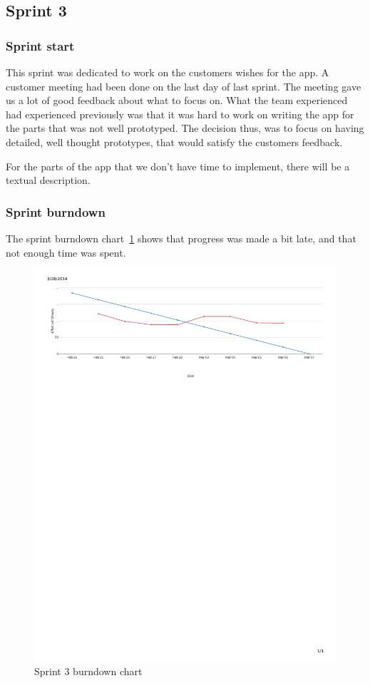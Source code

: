 \subsection{Sprint 3}
\subsubsection{Sprint start}
This sprint was dedicated to work on the customers wishes for the app. A customer meeting had been done on the last day of last sprint. The meeting gave us a lot of good feedback about what to focus on.
What the team experienced had experienced previously was that it was hard to work on writing the app for the parts that was not well prototyped.
The decision thus, was to focus on having detailed, well thought prototypes, that would satisfy the customers feedback. 

For the parts of the app that we don't have time to implement, there will be a textual description.

\subsubsection{Sprint burndown}

The sprint burndown chart~\ref{fig:sprint3burndown} shows that progress was made a bit late, and that not enough time was spent.

\begin{figure}[H]
\includegraphics[width=\textwidth, trim= 1cm 21cm 1cm 1cm, clip=true]{ch/projectManagement/fig/burndown3.pdf}
\caption{Sprint 3 burndown chart}
\label{fig:sprint3burndown}
\end{figure}

